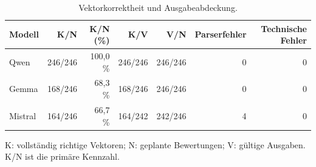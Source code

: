 \begin{table}[htbp]
\centering\small
\caption{Vektorkorrektheit und Ausgabeabdeckung.}
\label{tab_v2_rq1}
\begin{tabular}{lrrrrrr}
\toprule
Modell & K/N & K/N (\%) & K/V & V/N & Parserfehler & Technische Fehler \\
\midrule
Qwen & 246/246 & 100,0 \% & 246/246 & 246/246 & 0 & 0 \\
Gemma & 168/246 & 68,3 \% & 168/246 & 246/246 & 0 & 0 \\
Mistral & 164/246 & 66,7 \% & 164/242 & 242/246 & 4 & 0 \\
\bottomrule
\end{tabular}
\par\smallskip\noindent
\begin{minipage}{\linewidth}\footnotesize K: vollständig richtige Vektoren; N: geplante Bewertungen; V: gültige Ausgaben. K/N ist die primäre Kennzahl.\end{minipage}
\end{table}
